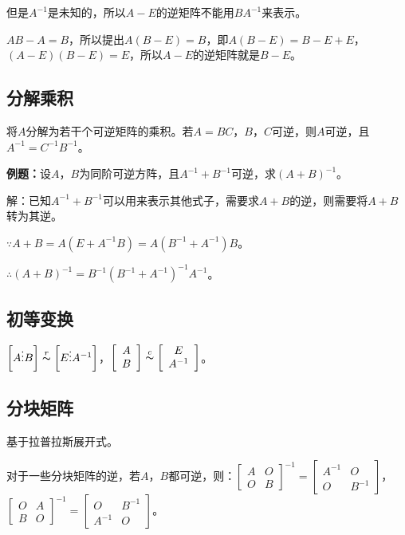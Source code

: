 \documentclass[UTF8, 12pt]{ctexart}
\begin{document}
但是$A^{-1}$是未知的，所以$A-E$的逆矩阵不能用$BA^{-1}$来表示。

$AB-A=B$，所以提出$A(B-E)=B$，即$A(B-E)=B-E+E$，$(A-E)(B-E)=E$，所以$A-E$的逆矩阵就是$B-E$。

\subsection{分解乘积}

将$A$分解为若干个可逆矩阵的乘积。若$A=BC$，$B$，$C$可逆，则$A$可逆，且$A^{-1}=C^{-1}B^{-1}$。

\textbf{例题：}设$A$，$B$为同阶可逆方阵，且$A^{-1}+B^{-1}$可逆，求$(A+B)^{-1}$。

解：已知$A^{-1}+B^{-1}$可以用来表示其他式子，需要求$A+B$的逆，则需要将$A+B$转为其逆。

$\because A+B=A(E+A^{-1}B)=A(B^{-1}+A^{-1})B$。

$\therefore (A+B)^{-1}=B^{-1}(B^{-1}+A^{-1})^{-1}A^{-1}$。

\subsection{初等变换}

$\left[A\vdots B\right]\overset{r}{\thicksim}\left[E\vdots A^{-1}\right]$，$\left[\begin{array}{c}
    A \\
    B
\end{array}\right]\overset{c}{\thicksim}\left[\begin{array}{c}
    E \\
    A^{-1}
\end{array}\right]$。

\subsection{分块矩阵}

基于拉普拉斯展开式。

对于一些分块矩阵的逆，若$A$，$B$都可逆，则：$\left[\begin{array}{cc}
    A & O \\
    O & B
\end{array}\right]^{-1}=\left[\begin{array}{cc}
    A^{-1} & O \\
    O & B^{-1}
\end{array}\right]$，$\left[\begin{array}{cc}
    O & A \\
    B & O
\end{array}\right]^{-1}=\left[\begin{array}{cc}
    O & B^{-1} \\
    A^{-1} & O
\end{array}\right]$。\medskip
\end{document}
